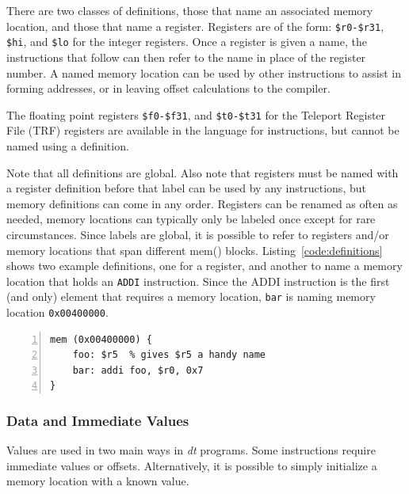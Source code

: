 There are two classes of definitions, those that 
name an associated memory location, and those that
name a register.  Registers are of the form: \texttt{\$r0-\$r31},
\texttt{\$hi}, and \texttt{\$lo} for the integer registers. 
Once a register is given a name, the instructions that follow
can then refer to the name in place of the register number.
A named memory location can be used by other instructions
to assist in forming addresses, or in leaving offset
calculations to the compiler. 

The floating point registers \texttt{\$f0-\$f31}, and 
\texttt{\$t0-\$t31} for the Teleport Register File (TRF) registers
are available in the language for instructions, but cannot be 
named using a definition.

Note that all definitions are global.  Also note that 
registers must be named with a register definition
before that label can be used by any instructions, 
but memory definitions can come in any order.
Registers can be renamed as often as needed, 
memory locations can typically only be labeled once
except for rare circumstances. Since labels are 
global, it is possible to refer to registers
and/or memory locations that span different mem() blocks.
Listing~\ref{code:definitions} shows two example 
definitions, one for a register, and another to 
name a memory location that holds an \texttt{ADDI} instruction.
Since the ADDI instruction is the first (and only)
element that requires a memory location, 
\texttt{bar} is naming memory location \texttt{0x00400000}.

\begin{lstlisting}[label=code:definitions,caption=Code example of a register and memory definition,basicstyle=\footnotesize,numbers=left,numberstyle=\tiny,stepnumber=1, numbersep=6pt,frame=single,captionpos=b,escapechar=@]
mem (0x00400000) {
    foo: $r5  % gives $r5 a handy name
    bar: addi foo, $r0, 0x7
}
\end{lstlisting}

\subsubsection{Data and Immediate Values\label{sec:values}}

Values are used in two main ways in \emph{dt} programs. Some
instructions require immediate values or offsets.  Alternatively, 
it is possible to simply initialize a memory location with 
a known value.

